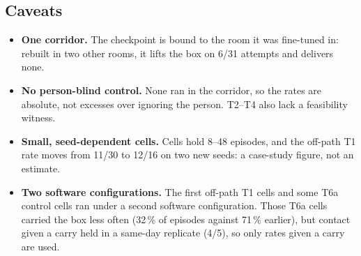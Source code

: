 \subsection{Caveats}
\label{app:g1-caveats}

\begin{itemize}\setlength{\itemsep}{1pt}\setlength{\parskip}{0pt}
\item \textbf{One corridor.} The checkpoint is bound to the room it was fine-tuned in: rebuilt in two other rooms, it lifts the box on 6/31 attempts and delivers none.
\item \textbf{No person-blind control.} None ran in the corridor, so the rates are absolute, not excesses over ignoring the person. T2--T4 also lack a feasibility witness.
\item \textbf{Small, seed-dependent cells.} Cells hold 8--48 episodes, and the off-path T1 rate moves from 11/30 to 12/16 on two new seeds: a case-study figure, not an estimate.
\item \textbf{Two software configurations.} The first off-path T1 cells and some T6a control cells ran under a second software configuration. Those T6a cells carried the box less often (32\,\% of episodes against 71\,\% earlier), but contact given a carry held in a same-day replicate (4/5), so only rates given a carry are used.
\end{itemize}
